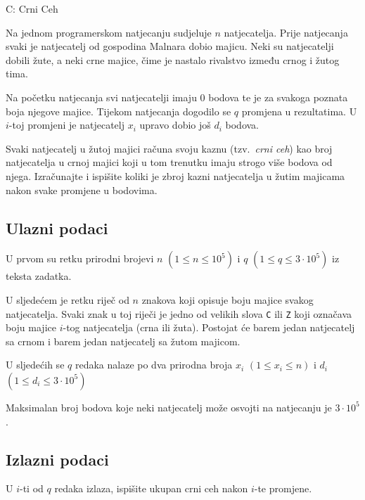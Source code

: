 \begin{statement}[
  timelimit=1 s,
  memorylimit=512 MiB,
]{C: Crni Ceh}

Na jednom programerskom natjecanju sudjeluje $n$ natjecatelja. Prije natjecanja
svaki je natjecatelj od gospodina Malnara dobio majicu. Neki su natjecatelji
dobili žute, a neki crne majice, čime je nastalo rivalstvo između crnog i žutog
tima.

Na početku natjecanja svi natjecatelji imaju $0$ bodova te je za svakoga poznata
boja njegove majice. Tijekom natjecanja dogodilo se $q$ promjena u rezultatima.
U $i$-toj promjeni je natjecatelj $x_i$ upravo dobio još $d_i$ bodova.

Svaki natjecatelj u žutoj majici računa svoju kaznu (tzv.\ \textit{crni ceh})
kao broj natjecatelja u crnoj majici koji u tom trenutku imaju strogo više
bodova od njega. Izračunajte i ispišite koliki je zbroj kazni natjecatelja u
žutim majicama nakon svake promjene u bodovima.

\subsection*{Ulazni podaci}
U prvom su retku prirodni brojevi $n$ $(1 \le n \le 10^5) $ i
$q$ $(1 \le q \le 3 \cdot 10^5)$ iz teksta zadatka.

U sljedećem je retku riječ od $n$ znakova koji opisuje boju majice svakog
natjecatelja. Svaki znak u toj riječi je jedno od velikih slova \texttt{C}
ili \texttt{Z} koji označava boju majice $i$-tog natjecatelja (crna ili žuta).
Postojat će barem jedan natjecatelj sa crnom i barem jedan natjecatelj sa žutom
majicom.

U sljedećih se $q$ redaka nalaze po dva prirodna broja $x_i$ $(1 \le x_i \le n)$ i
$d_i$ $(1 \le d_i \le 3 \cdot 10^5)$

Maksimalan broj bodova koje neki natjecatelj može osvojti na natjecanju je
$3 \cdot 10^5$.

\subsection*{Izlazni podaci}
U $i$-ti od $q$ redaka izlaza, ispišite ukupan crni ceh nakon $i$-te promjene.


\end{statement}
